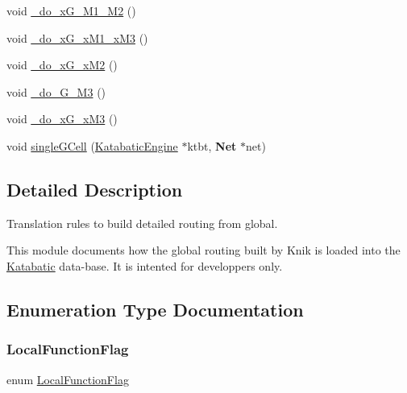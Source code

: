 \begin{DoxyCompactItemize}
\item 
void \hyperlink{group__LoadGlobalRouting_gae60ed4e27ad89a1e2ff2cd6415ef33f1}{\+\_\+do\+\_\+x\+G\+\_\+M1\+\_\+M2} ()
\item 
void \hyperlink{group__LoadGlobalRouting_gaf9b009520f54099668ac9d12f2c85257}{\+\_\+do\+\_\+x\+G\+\_\+x\+M1\+\_\+x\+M3} ()
\item 
void \hyperlink{group__LoadGlobalRouting_ga532d1c6b530e0375078ea2d6ea3c6024}{\+\_\+do\+\_\+x\+G\+\_\+x\+M2} ()
\item 
void \hyperlink{group__LoadGlobalRouting_ga2519ef984b3d19f123827a9b12651672}{\+\_\+do\+\_\+G\+\_\+M3} ()
\item 
void \hyperlink{group__LoadGlobalRouting_ga007efc725aae31782204a44949765cb4}{\+\_\+do\+\_\+x\+G\+\_\+x\+M3} ()
\item 
void \hyperlink{group__LoadGlobalRouting_ga3973291866b39c10cea5ca17f7d174fb}{single\+G\+Cell} (\hyperlink{classKatabatic_1_1KatabaticEngine}{Katabatic\+Engine} $\ast$ktbt, \textbf{ Net} $\ast$net)
\end{DoxyCompactItemize}


\subsection{Detailed Description}
Translation rules to build detailed routing from global. 

This module documents how the global routing built by {\ttfamily Knik} is loaded into the {\ttfamily \hyperlink{namespaceKatabatic}{Katabatic}} data-\/base. It is intented for developpers only. 

\subsection{Enumeration Type Documentation}
\mbox{\label{group__LoadGlobalRouting_gaec07c7f30c801c3b0f72193757250d64}} 
\subsubsection{\texorpdfstring{Local\+Function\+Flag}{LocalFunctionFlag}}
{\footnotesize\ttfamily enum \hyperlink{group__LoadGlobalRouting_gaec07c7f30c801c3b0f72193757250d64}{Local\+Function\+Flag}}

